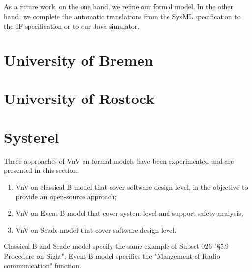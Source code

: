 \documentclass{template/openetcs_article}
\begin{document}
As a future work, on the one hand, we refine our formal model.
In the other hand, we complete the automatic translations from the SysML specification to the IF specification or to our Java simulator.

\newpage



\newpage

\section{University of Bremen}



\newpage

\section{University of Rostock }



\newpage

\section{Systerel}

Three approaches of VnV  on formal models have been experimented and are presented in this section:

\begin{enumerate}
\item VnV on classical B  model that cover software design level, in the objective to provide an open-source approach;
\item VnV on Event-B model that cover system level and support safety analysis;
\item VnV on Scade model that cover software design level.
\end{enumerate}

Classical B and Scade model specify the same example of Subset 026 "§5.9 Procedure on-Sight", Event-B model specifies the "Mangement of Radio communication" function.









\nocite{*}

%



%
\end{document}
